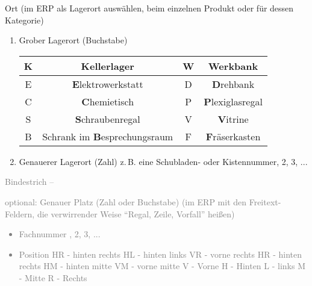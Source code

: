 \documentclass{\basedir/fablab-document}
\begin{document}
\begin{enumerate}
\item Ort (im ERP als Lagerort auswählen, beim einzelnen Produkt oder für dessen Kategorie)
\begin{enumerate}
\item Grober Lagerort (Buchstabe)
	
	\begin{tabular}{c|c|c|c}
	\hline 
	K & \textbf{K}ellerlager & W & \textbf{W}erkbank \\ 
	\hline 
	E & \textbf{E}lektrowerkstatt & D & \textbf{D}rehbank \\ 
	\hline 
	C & \textbf{C}hemietisch & P & \textbf{P}lexiglasregal \\ 
	\hline 
	S & \textbf{S}chraubenregal & V & \textbf{V}itrine \\ 
	\hline 
	B & Schrank im \textbf{B}esprechungsraum & F & \textbf{F}räserkasten \\ 
	\hline 
	\end{tabular} 
\item Genauerer Lagerort (Zahl) \newline
	z.\,B. eine Schubladen- oder Kistennummer, 2, 3, ...
\end{enumerate}
\textcolor{gray}{
\item    Bindestrich --
\item   optional: Genauer Platz (Zahl oder Buchstabe) (im ERP mit den Freitext-Feldern, die verwirrender Weise \enquote{Regal, Zeile, Vorfall} heißen)
	\begin{itemize}
	\item Fachnummer , 2, 3, ...
	\item Position\newline
    HR - hinten rechts\newline
    HL - hinten links\newline
    VR - vorne rechts\newline
    HR - hinten rechts\newline
    HM - hinten mitte\newline
    VM - vorne mitte\newline
    V - Vorne\newline
    H - Hinten\newline
    L - links\newline
    M - Mitte\newline
    R - Rechts
	\end{itemize}
}
\end{enumerate}
\end{document}
